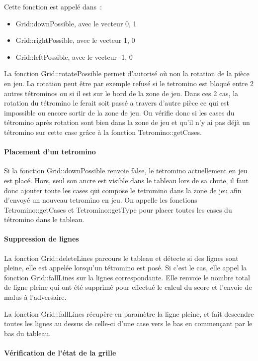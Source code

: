 \documentclass[a4paper, 12pt]{article}
\begin{document}
				Cette fonction est appelé dans : 
				\begin{itemize}
					\item Grid::downPossible, avec le vecteur {0, 1}
					\item Grid::rightPossible, avec le vecteur {1, 0}
					\item Grid::leftPossible, avec le vecteur {-1, 0}
				\end{itemize}

				La fonction Grid::rotatePossible permet d’autorisé où non la rotation de la pièce en jeu. La rotation peut être par exemple refusé si le tetromino est bloqué entre 2 autres tétrominos ou si il est sur le bord de la zone de jeu. Dans ces 2 cas, la rotation du tétromino le ferait soit passé a travers d’autre pièce ce qui est impossible ou encore sortir de la zone de jeu. On vérifie donc si les cases du tétromino après rotation sont bien dans la zone de jeu et qu'il n'y ai pas déjà un tétromino sur cette case grâce à la fonction Tetromino::getCases.

			\paragraph{Placement d’un tetromino}
				Si la fonction Grid::downPossible renvoie false, le tetromino actuellement en jeu est placé. Hors, seul son ancre est visible dans le tableau lors de sa chute, il faut donc ajouter toute les cases qui compose le tetromino dans la zone de jeu afin d’envoyé un nouveau tetromino en jeu.
				On appelle les fonctions Tetromino::getCases et Tetromino::getType pour placer toutes les cases du tétromino dans le tableau.

			\paragraph{Suppression de lignes}
				La fonction Grid::deleteLines parcours le tableau et détecte si des lignes sont pleine, elle est appelée lorsqu'un tétromino est posé.
				Si c’est le cas, elle appel la fonction Grid::fallLines sur la lignes correspondante.
				Elle renvoie le nombre total de ligne pleine qui ont été supprimé pour effectué le calcul du score et l’envoie de malus à l’adversaire.

				La fonction Grid::fallLines récupère en paramètre la ligne pleine, et fait descendre toutes les lignes au dessus de celle-ci d’une case vers le bas en commençant par le bas du tableau.

			\paragraph{Vérification de l’état de la grille}
\end{document}

